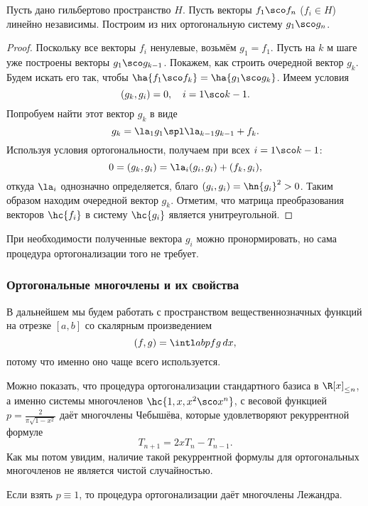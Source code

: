 \documentclass[a4paper]{article}
\begin{document}
\begin{lemma}
Пусть дано гильбертово пространство $H$.  Пусть векторы $f_1\sco f_n$
($f_i \in H$) линейно независимы.  Построим из них ортогональную
систему $g_1\sco g_n$.
\end{lemma}
\begin{proof}
Поскольку все векторы $f_i$ ненулевые, возьмём $g_1 = f_1$.  Пусть на
$k$ м шаге уже построены векторы $g_1\sco g_{k-1}$. Покажем, как
строить очередной вектор $g_k$.  Будем искать его так, чтобы
$\ha{f_1\sco f_k} = \ha{g_1\sco g_k}$.  Имеем условия
$$(g_k, g_i) = 0, \quad i = 1\sco k-1.$$ Попробуем найти этот вектор
$g_k$ в виде
$$g_k = \la_1 g_1\spl \la_{k-1} g_{k-1} + f_k.$$ Используя условия
ортогональности, получаем при всех $i = 1\sco k-1$:
$$0 = (g_k, g_i) = \la_i (g_i,g_i) + (f_k,g_i),$$ откуда $\la_i$
однозначно определяется, благо $(g_i, g_i) = \hn{g_i}^2 > 0$.  Таким
образом находим очередной вектор $g_k$. Отметим, что матрица
преобразования векторов $\hc{f_i}$ в систему $\hc{g_i}$ является
унитреугольной.
\end{proof}

\begin{note}
При необходимости полученные вектора $g_i$ можно пронормировать, но
сама процедура ортогонализации того не требует.
\end{note}

\subsubsection{Ортогональные многочлены и их свойства}

В дальнейшем мы будем работать с пространством вещественнозначных
функций на отрезке $[a,b]$ со скалярным произведением
$$(f,g) = \intl ab pfg\dx,$$ потому что именно оно чаще всего
используется.

\begin{ex}
Можно показать, что процедура ортогонализации стандартного базиса в
$\R[x]_{\le n}$, а именно системы многочленов $\hc{1,x,x^2\sco x^n}$,
с весовой функцией $p = \frac{2}{\pi\sqrt{1-x^2}}$ даёт многочлены
Чебышёва, которые удовлетворяют рекуррентной формуле
$$T_{n+1} = 2x T_n - T_{n-1}.$$ Как мы потом увидим, наличие такой
рекуррентной формулы для ортогональных многочленов не является чистой
случайностью.
\end{ex}

\begin{ex}
Если взять $p \equiv 1$, то процедура ортогонализации даёт многочлены
Лежандра.
\end{ex}
\end{document}
